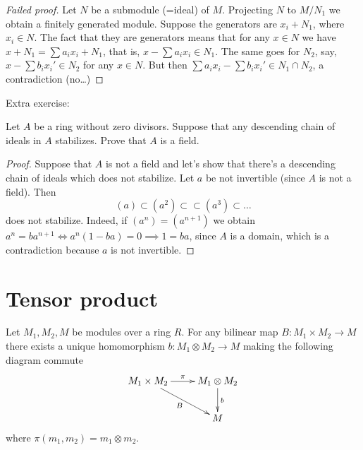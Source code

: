 \begin{proof}[Failed proof]
Let $N$ be a submodule (=ideal) of $M$.
Projecting $N$ to $M/N_1$
we obtain a finitely generated module.
Suppose the generators are
$x_i + N_1$, where $x_i \in N$.
The fact that they are generators means
that for any $x \in N$ we have
$x+N_1=\sum a_ix_i + N_1$,
that is, $x-\sum a_ix_i \in N_1$.
The same goes for $N_2$, say,
$x - \sum b_i x_i' \in N_2$ for any
$x \in N$. But then
$\sum a_i x_i - \sum b_i x_i' \in N_1\cap
N_2$, a contradiction (no…)
\end{proof}

\medskip\noindent
Extra exercise:

\begin{exercise}
\label{exercise-descending-chains-is-field}
Let $A$ be a ring without zero divisors.
Suppose that any descending chain of
ideals in $A$ stabilizes. Prove
that $A$ is a field.
\end{exercise}

\begin{proof}
Suppose that $A$ is not a field
and let's show that there's a descending
chain of ideals which does not stabilize.
Let $a$ be not invertible (since $A$
is not a field).
Then 
$$
(a)\subset (a^2) \subset \subset (a^3)
\subset…
$$
does not stabilize. Indeed,
if $(a^n)=(a^{n+1})$ we obtain
$a^n=ba^{n+1}\iff a^n(1-ba)=0
\implies  1=ba$, since $A$ is a domain,
which is a contradiction because
$a$ is not invertible.
\end{proof}

\section{Tensor product}
\label{section-tensor-product}

\begin{definition}
\label{definition-tensor-product}

\end{definition}

\begin{theorem}
\label{theorem-unive-prope-tenso-produ}
Let $M_1,M_2,M$ be modules over a ring $R$.
For any bilinear map $B:M_1\times M_2 \to M$
there exists
a unique homomorphism $b:M_1 \otimes M_2 \to
M$
making the following diagram commute
$$
\xymatrix{
M_1\times M_2 \ar[r]^\pi\ar[dr]_B &  M_1
\otimes M_2 \ar[d]^b\\
& M
}
$$
where $\pi(m_1,m_2)=m_1 \otimes m_2$.
\end{theorem}

